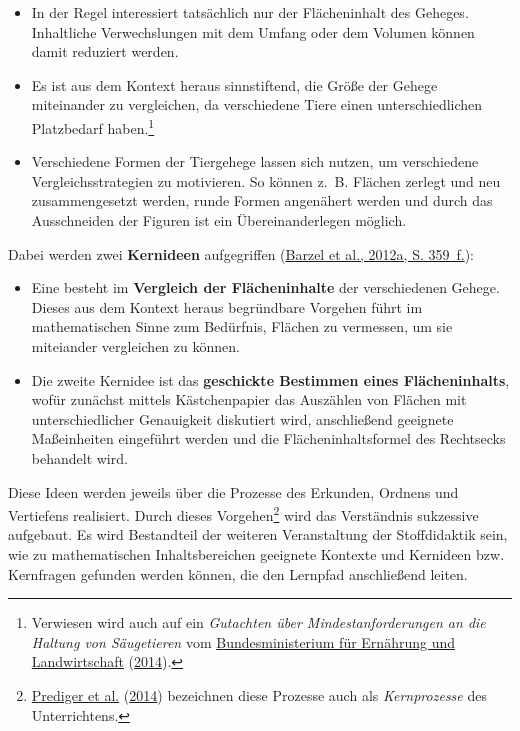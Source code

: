 \documentclass[
  ngerman,
]{scrbook}
\providecommand{\tightlist}{%
  \setlength{\itemsep}{0pt}\setlength{\parskip}{0pt}}
\theoremstyle{definition}
\theoremstyle{definition}
\theoremstyle{definition}
\theoremstyle{definition}
\theoremstyle{remark}
\begin{document}
\begin{itemize}
\tightlist
\item
  In der Regel interessiert tatsächlich nur der Flächeninhalt des Geheges. Inhaltliche Verwechslungen mit dem Umfang oder dem Volumen können damit reduziert werden.\\
\item
  Es ist aus dem Kontext heraus sinnstiftend, die Größe der Gehege miteinander zu vergleichen, da verschiedene Tiere einen unterschiedlichen Platzbedarf haben.\footnote{Verwiesen wird auch auf ein \emph{Gutachten über Mindestanforderungen an die Haltung von Säugetieren} vom \protect\hyperlink{ref-BundesministeriumfurErnahrungundLandwirtschaft2014}{Bundesministerium für Ernährung und Landwirtschaft} (\protect\hyperlink{ref-BundesministeriumfurErnahrungundLandwirtschaft2014}{2014}).}
\item
  Verschiedene Formen der Tiergehege lassen sich nutzen, um verschiedene Vergleichsstrategien zu motivieren. So können z.~B. Flächen zerlegt und neu zusammengesetzt werden, runde Formen angenähert werden und durch das Ausschneiden der Figuren ist ein Übereinanderlegen möglich.
\end{itemize}

Dabei werden zwei \textbf{Kernideen} aufgegriffen (\protect\hyperlink{ref-Barzel2012a}{Barzel et al., 2012a, S. 359~f.}):

\begin{itemize}
\tightlist
\item
  Eine besteht im \textbf{Vergleich der Flächeninhalte} der verschiedenen Gehege. Dieses aus dem Kontext heraus begründbare Vorgehen führt im mathematischen Sinne zum Bedürfnis, Flächen zu vermessen, um sie miteiander vergleichen zu können.\\
\item
  Die zweite Kernidee ist das \textbf{geschickte Bestimmen eines Flächeninhalts}, wofür zunächst mittels Kästchenpapier das Auszählen von Flächen mit unterschiedlicher Genauigkeit diskutiert wird, anschließend geeignete Maßeinheiten eingeführt werden und die Flächeninhaltsformel des Rechtsecks behandelt wird.
\end{itemize}

Diese Ideen werden jeweils über die Prozesse des Erkunden, Ordnens und Vertiefens realisiert. Durch dieses Vorgehen\footnote{\protect\hyperlink{ref-Prediger2014}{Prediger et al.} (\protect\hyperlink{ref-Prediger2014}{2014}) bezeichnen diese Prozesse auch als \emph{Kernprozesse} des Unterrichtens.} wird das Verständnis sukzessive aufgebaut. Es wird Bestandteil der weiteren Veranstaltung der Stoffdidaktik sein, wie zu mathematischen Inhaltsbereichen geeignete Kontexte und Kernideen bzw. Kernfragen gefunden werden können, die den Lernpfad anschließend leiten.
\end{document}
